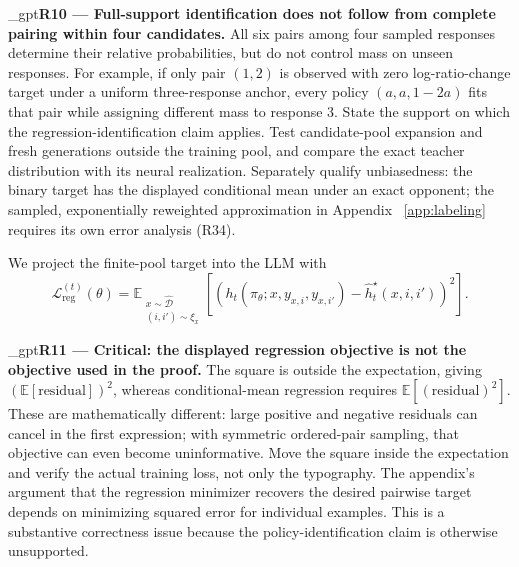 \documentclass{article}
\makeatletter
\newif\ifshowreviews
\let\revieworiginalref\ref
\newcommand{\reviewref}[1]{%
  \@ifundefined{r@#1}{\textnormal{[original-draft ref.: \texttt{\detokenize{#1}}]}}%
  {\revieworiginalref{#1}}}
\let\ref\reviewref
\newcommand{\reviewresponse}[1]{%
  \ifshowreviews
  \par\begingroup\color{blue!65!black}\hypersetup{allcolors=blue!65!black}\emergencystretch=2em%
  \noindent\textbf{Response:} #1\par\endgroup
  \fi}
\theoremstyle{remark}
\theoremstyle{plain}
\newcommand{\E}{\mathbb{E}}
\makeatother
\begin{document}
\kekim_gpt{\textbf{R10 --- Full-support identification does not follow from complete pairing within four candidates.} All six pairs among four sampled responses determine their relative probabilities, but do not control mass on unseen responses. For example, if only pair $(1,2)$ is observed with zero log-ratio-change target under a uniform three-response anchor, every policy $(a,a,1-2a)$ fits that pair while assigning different mass to response 3. State the support on which the regression-identification claim applies. Test candidate-pool expansion and fresh generations outside the training pool, and compare the exact teacher distribution with its neural realization. Separately qualify unbiasedness: the binary target has the displayed conditional mean under an exact opponent; the sampled, exponentially reweighted approximation in Appendix~\ref{app:labeling} requires its own error analysis (R34).}
\reviewresponse{\textbf{R10 --- Partially addressed.} Identification is restricted to connected sampled support, with an unseen-mass counterexample. Independent fitted-pool and fresh-response measurements are now available, but their valid prompt sets differ and they do not control unseen probability mass. Candidate-count pilots do not constitute a controlled neural pool-expansion study; quantitative finite-sampling error remains pending.}


We project the finite-pool target into the LLM with
\begin{equation}
\mathcal L_{\mathrm{reg}}^{(t)}(\theta)
=
\E_{\substack{x\sim\widehat{\mathcal D}\\(i,i')\sim\xi_x}}
\!\left[
\left(
 h_t(\pi_\theta;x,y_{x,i},y_{x,i'})
-\widehat h_t^\star(x,i,i')
\right)^2
\right].
\label{eq:regression-loss}
\end{equation}

\kekim_gpt{\textbf{R11 --- Critical: the displayed regression objective is not the objective used in the proof.} The square is outside the expectation, giving $(\E[\mathrm{residual}])^2$, whereas conditional-mean regression requires $\E[(\mathrm{residual})^2]$. These are mathematically different: large positive and negative residuals can cancel in the first expression; with symmetric ordered-pair sampling, that objective can even become uninformative. Move the square inside the expectation and verify the actual training loss, not only the typography. The appendix's argument that the regression minimizer recovers the desired pairwise target depends on minimizing squared error for individual examples. This is a substantive correctness issue because the policy-identification claim is otherwise unsupported.}
\reviewresponse{\textbf{R11 --- Partially addressed.} Equation~\eqref{eq:regression-loss} places each example's squared residual inside the expectation. The reported pilot checks the explicit-pair/centered all-candidate identity in value and gradient to $2.8\times10^{-14}$ on solver targets. This supports that algebraic check, not an independent audit of the complete training implementation, which was not included in the supplied artifacts.}
\end{document}
